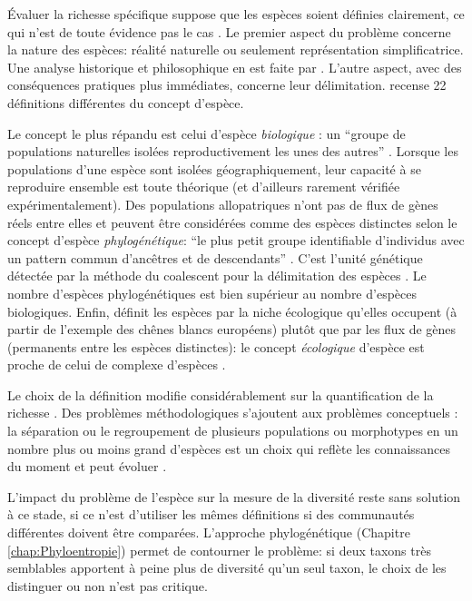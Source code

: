 \documentclass[
  11pt,
  french,
  a4paper,
  extrafontsizes,onecolumn,openright
  ]{memoir}
\begin{document}
Évaluer la richesse spécifique suppose que les espèces soient définies clairement, ce qui n'est de toute évidence pas le cas \autocite{Casetta2014a}.
Le premier aspect du problème concerne la nature des espèces: réalité naturelle ou seulement représentation simplificatrice.
Une analyse historique et philosophique en est faite par \textcite{Richards2010}.
L'autre aspect, avec des conséquences pratiques plus immédiates, concerne leur délimitation.
\textcite{Mayden1997} recense 22 définitions différentes du concept d'espèce.

Le concept le plus répandu est celui d'espèce \emph{biologique} \autocite{Dobzhansky1937}: un \enquote{groupe de populations naturelles isolées reproductivement les unes des autres} \autocite{Mayr1942}.
Lorsque les populations d'une espèce sont isolées géographiquement, leur capacité à se reproduire ensemble est toute théorique (et d'ailleurs rarement vérifiée expérimentalement).
Des populations allopatriques n'ont pas de flux de gènes réels entre elles et peuvent être considérées comme des espèces distinctes selon le concept d'espèce \emph{phylogénétique}: \enquote{le plus petit groupe identifiable d'individus avec un pattern commun d'ancêtres et de descendants} \autocite{Cracraft1983}.
C'est l'unité génétique détectée par la méthode du coalescent pour la délimitation des espèces \autocite{Sukumaran2017}.
Le nombre d'espèces phylogénétiques est bien supérieur au nombre d'espèces biologiques.
Enfin, \textcite{VanValen1976} définit les espèces par la niche écologique qu'elles occupent (à partir de l'exemple des chênes blancs européens) plutôt que par les flux de gènes (permanents entre les espèces distinctes): le concept \emph{écologique} d'espèce est proche de celui de complexe d'espèces \autocite[ensemble d'espèces voisines échangeant des gènes,][]{Pernes1984}.

Le choix de la définition modifie considérablement sur la quantification de la richesse \autocite{Agapow2004}.
Des problèmes méthodologiques s'ajoutent aux problèmes conceptuels \autocite{Hey2001}: la séparation ou le regroupement de plusieurs populations ou morphotypes en un nombre plus ou moins grand d'espèces est un choix qui reflète les connaissances du moment et peut évoluer \autocite{Barberousse2014}.

L'impact du problème de l'espèce sur la mesure de la diversité reste sans solution à ce stade, si ce n'est d'utiliser les mêmes définitions si des communautés différentes doivent être comparées.
L'approche phylogénétique (Chapitre \ref{chap:Phyloentropie}) permet de contourner le problème: si deux taxons très semblables apportent à peine plus de diversité qu'un seul taxon, le choix de les distinguer ou non n'est pas critique.
\end{document}
